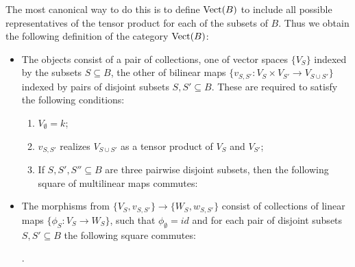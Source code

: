\documentclass{amsart}
\begin{document}
The most canonical way to do this is to define $\mathrm{Vect}(B)$ to include all possible representatives of the tensor product for each of the subsets of $B$. Thus we obtain the following definition of the category $\mathrm{Vect}(B)$: 
\begin{itemize}
	\item The objects consist of a pair of collections, one of vector spaces $\{ V_S \}$ indexed by the subsets $S \subseteq B$, 
	the other of bilinear maps $ \{ v_{S,S'}: V_S \times V_{S'} \to V_{S \cup S'} \} $ 
	indexed by pairs of disjoint subsets $S, S' \subseteq B$. These are required to satisfy the following conditions:
	\begin{enumerate}
		\item $V_{\emptyset} = k$; 
		\item $v_{S,S'}$ realizes $V_{S \cup S'}$ as a tensor product of $V_S$ and $V_{S'}$;
		\item If $S, S', S'' \subseteq B$ are three pairwise disjoint subsets, then the following square of multilinear maps commutes:
	\begin{center}
	\end{center}
	\end{enumerate} 
	\item The morphisms from $\{ V_S, v_{S, S'} \} \to \{ W_S, w_{S, S'} \}$ consist of collections of linear maps $\{ \phi_S: V_S \to W_S \}$, such that $\phi_{\emptyset} = id$ and for each pair of disjoint subsets $S, S' \subseteq B$ the following square commutes:
	\begin{center}
	.
	\end{center}
\end{itemize} 
\end{document}
